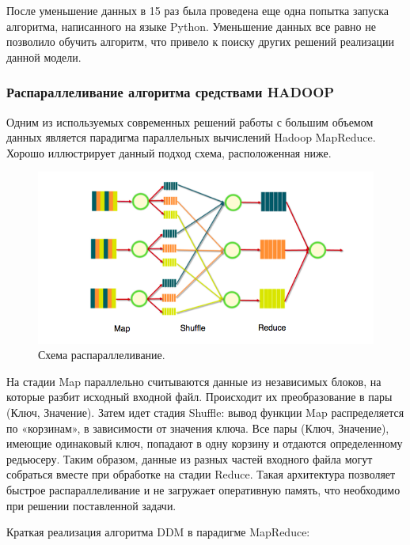 После уменьшение данных в 15 раз была проведена еще одна попытка запуска алгоритма,
написанного на языке Python. Уменьшение данных все равно не позволило обучить
алгоритм, что привело к поиску других решений реализации данной модели.

\subsubsection{Распараллеливание алгоритма средствами HADOOP}

Одним из используемых современных решений работы с большим объемом данных
является парадигма параллельных вычислений Hadoop MapReduce. Хорошо иллюстрирует
данный подход схема, расположенная ниже.

\begin{figure}[H]
\centering 
    \includegraphics[scale=0.6]{image/MapRed.png}
    \caption{Схема распараллеливание.}
    \label{srg}
\end{figure}

На стадии Map параллельно считываются данные из независимых блоков, на которые
разбит исходный входной файл. Происходит их преобразование в пары (Ключ, Значение).
Затем идет стадия Shuffle: вывод функции Map распределяется по «корзинам», в
зависимости от значения ключа. Все пары (Ключ, Значение), имеющие одинаковый ключ,
попадают в одну корзину и отдаются определенному редьюсеру. Таким образом, данные
из разных частей входного файла могут собраться вместе при обработке на стадии
Reduce. Такая архитектура позволяет быстрое распараллеливание и не загружает
оперативную память, что необходимо при решении поставленной задачи.

Краткая реализация алгоритма DDM в парадигме MapReduce:

